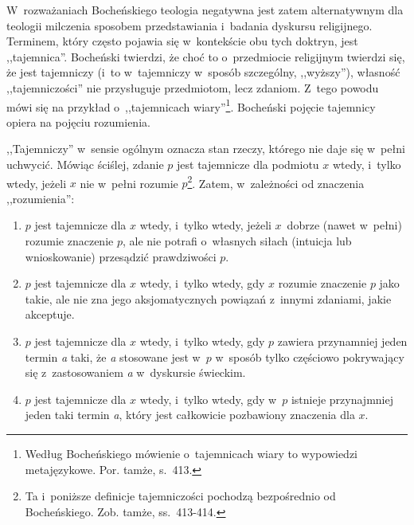W~rozważaniach Bocheńskiego teologia negatywna jest zatem alternatywnym dla teologii milczenia sposobem przedstawiania i~badania dyskursu religijnego. Terminem, który często pojawia się w~kontekście obu tych doktryn, jest ,,tajemnica''. Bocheński twierdzi, że choć to o~przedmiocie religijnym twierdzi się, że jest tajemniczy (i~to w~tajemniczy w~sposób szczególny, ,,wyższy''), własność ,,tajemniczości'' nie przysługuje przedmiotom, lecz zdaniom. Z~tego powodu mówi się na przykład o~,,tajemnicach wiary''\footnote{Według Bocheńskiego mówienie o~tajemnicach wiary to wypowiedzi metajęzykowe. Por. tamże, s.~413.}. Bocheński pojęcie tajemnicy opiera na pojęciu rozumienia.

\begin{defin}[Tajemnica]
,,Tajemniczy'' w~sensie ogólnym oznacza stan rzeczy, którego nie daje się w~pełni uchwycić. Mówiąc ściślej, zdanie $p$ jest tajemnicze dla podmiotu $x$ wtedy, i~tylko wtedy, jeżeli $x$ nie w~pełni rozumie $p$\footnote{Ta i~poniższe definicje tajemniczości pochodzą bezpośrednio od Bocheńskiego. Zob. tamże, ss.~413-414.}. Zatem, w~zależności od znaczenia ,,rozumienia'':

\begin{enumerate}[label = (\arabic*)]
\item $p$ jest tajemnicze dla $x$ wtedy, i~tylko wtedy, jeżeli $x$~dobrze (nawet w~pełni) rozumie znaczenie $p$, ale nie potrafi o~własnych siłach (intuicja lub wnioskowanie) przesądzić prawdziwości $p$.
\item $p$ jest tajemnicze dla $x$ wtedy, i~tylko wtedy, gdy $x$ rozumie znaczenie $p$ jako takie, ale nie zna jego aksjomatycznych powiązań z~innymi zdaniami, jakie akceptuje.
\item $p$ jest tajemnicze dla $x$ wtedy, i~tylko wtedy, gdy $p$ zawiera przynamniej jeden termin \textit{a} taki, że \textit{a} stosowane jest w~$p$ w~sposób tylko częściowo pokrywający się z~zastosowaniem \textit{a} w~dyskursie świeckim.
\item $p$ jest tajemnicze dla $x$ wtedy, i~tylko wtedy, gdy w~$p$ istnieje przynajmniej jeden taki termin \textit{a}, który jest całkowicie pozbawiony znaczenia dla $x$.
\end{enumerate}
\end{defin}


